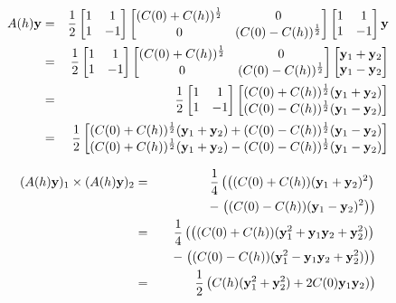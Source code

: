 \begin{eqnarray*}
A(h)\mathbf{y}&=&\frac12\begin{bmatrix}1&1\\1&-1\end{bmatrix}\begin{bmatrix}(C(0)+C(h))^{\frac12}&0\\0&(C(0)-C(h))^{\frac12}\end{bmatrix}\begin{bmatrix}1&1\\1&-1\end{bmatrix}\mathbf{y}\\
&=&\frac12\begin{bmatrix}1&1\\1&-1\end{bmatrix}\begin{bmatrix}(C(0)+C(h))^{\frac12}&0\\0&(C(0)-C(h))^{\frac12}\end{bmatrix}\begin{bmatrix}\mathbf{y}_1+\mathbf{y}_2\\\mathbf{y}_1-\mathbf{y}_2\end{bmatrix}\\
&=&\frac12\begin{bmatrix}1&1\\1&-1\end{bmatrix}\begin{bmatrix}(C(0)+C(h))^{\frac12}(\mathbf{y}_1+\mathbf{y}_2)\\(C(0)-C(h))^{\frac12}(\mathbf{y}_1-\mathbf{y}_2)\end{bmatrix}\\
&=&\frac12\begin{bmatrix}(C(0)+C(h))^{\frac12}(\mathbf{y}_1+\mathbf{y}_2)+(C(0)-C(h))^{\frac12}(\mathbf{y}_1-\mathbf{y}_2)\\(C(0)+C(h))^{\frac12}(\mathbf{y}_1+\mathbf{y}_2)-(C(0)-C(h))^{\frac12}(\mathbf{y}_1-\mathbf{y}_2)\end{bmatrix}\end{eqnarray*}

\begin{eqnarray*}
(A(h)\mathbf{y})_1\times (A(h)\mathbf{y})_2&=&
\frac14 \left(\left((C(0)+C(h))(\mathbf{y}_1+\mathbf{y}_2)^2\right)\right.\\
&&\quad-\left.
\left((C(0)-C(h))(\mathbf{y}_1-\mathbf{y}_2)^2\right)\right)\\
&=&
\frac14 \left(\left((C(0)+C(h))(\mathbf{y}_1^2+\mathbf{y}_1\mathbf{y}_2+\mathbf{y}_2^2)\right)\right.\\
&&\quad-\left.
\left((C(0)-C(h))(\mathbf{y}_1^2-\mathbf{y}_1\mathbf{y}_2+\mathbf{y}_2^2)\right)\right)\\
&=&
\frac12 \left(C(h)(\mathbf{y}_1^2+\mathbf{y}_2^2)+2C(0)\mathbf{y}_1\mathbf{y}_2)\right)
\end{eqnarray*}

